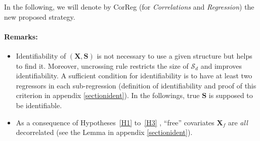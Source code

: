 \documentclass[12pt,a4paper]{report}
\begin{document}

In the following, we will denote by {\sc CorReg} (for {\it Correlations} and {\it Regression}) the new proposed strategy.

\paragraph{Remarks:} 
\begin{itemize}
\item Identifiability of $(\boldsymbol{X},\boldsymbol{S})$ is not necessary to use a given structure but helps to find it. Moreover, uncrossing rule restricts the size of $\mathcal{S}_d$ and improves identifiability. A sufficient condition for identifiability is to have at least two regressors in each sub-regression (definition of identifiability and proof of this criterion in appendix \ref{sectionident}). 
In the followings, true $\boldsymbol{S}$ is supposed to be identifiable.
\item As a consequence of Hypotheses~\ref{H1} to~\ref{H3} , ``free'' covariates $\boldsymbol{X}_f$ are {\it all} decorrelated (see the Lemma in appendix \ref{sectionident}).
\end{itemize}
	

\end{document}
